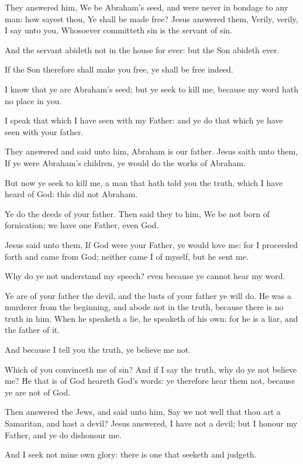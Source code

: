 \Verse They answered him, We be Abraham's seed, and were never in bondage to any man: how sayest thou, Ye shall be made free?  \Verse Jesus answered them, Verily, verily, I say unto you, Whosoever committeth sin is the servant of sin.

\Verse And the servant abideth not in the house for ever: but the Son abideth ever.

\Verse If the Son therefore shall make you free, ye shall be free indeed.

\Verse I know that ye are Abraham's seed; but ye seek to kill me, because my word hath no place in you.

\Verse I speak that which I have seen with my Father: and ye do that which ye have seen with your father.

\Verse They answered and said unto him, Abraham is our father. Jesus saith unto them, If ye were Abraham's children, ye would do the works of Abraham.

\Verse But now ye seek to kill me, a man that hath told you the truth, which I have heard of God: this did not Abraham.

\Verse Ye do the deeds of your father. Then said they to him, We be not born of fornication; we have one Father, even God.

\Verse Jesus said unto them, If God were your Father, ye would love me: for I proceeded forth and came from God; neither came I of myself, but he sent me.

\Verse Why do ye not understand my speech? even because ye cannot hear my word.

\Verse Ye are of your father the devil, and the lusts of your father ye will do. He was a murderer from the beginning, and abode not in the truth, because there is no truth in him. When he speaketh a lie, he speaketh of his own: for he is a liar, and the father of it.

\Verse And because I tell you the truth, ye believe me not.

\Verse Which of you convinceth me of sin? And if I say the truth, why do ye not believe me?  \Verse He that is of God heareth God's words: ye therefore hear them not, because ye are not of God.

\Verse Then answered the Jews, and said unto him, Say we not well that thou art a Samaritan, and hast a devil?  \Verse Jesus answered, I have not a devil; but I honour my Father, and ye do dishonour me.

\Verse And I seek not mine own glory: there is one that seeketh and judgeth.

